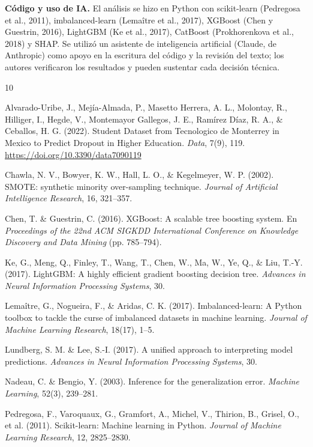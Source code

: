 \documentclass[11pt,a4paper]{article}
\begin{document}
\textbf{Código y uso de IA.} El análisis se hizo en Python con scikit-learn (Pedregosa et al., 2011), imbalanced-learn (Lemaître et al., 2017), XGBoost (Chen y Guestrin, 2016), LightGBM (Ke et al., 2017), CatBoost (Prokhorenkova et al., 2018) y SHAP. Se utilizó un asistente de inteligencia artificial (Claude, de Anthropic) como apoyo en la escritura del código y la revisión del texto; los autores verificaron los resultados y pueden sustentar cada decisión técnica.

\begin{thebibliography}{10}
\footnotesize
\setlength{\itemsep}{1pt}

Alvarado-Uribe, J., Mejía-Almada, P., Masetto Herrera, A. L., Molontay, R., Hilliger, I., Hegde, V., Montemayor Gallegos, J. E., Ramírez Díaz, R. A., \& Ceballos, H. G. (2022). Student Dataset from Tecnologico de Monterrey in Mexico to Predict Dropout in Higher Education. \textit{Data}, 7(9), 119. \url{https://doi.org/10.3390/data7090119}

Chawla, N. V., Bowyer, K. W., Hall, L. O., \& Kegelmeyer, W. P. (2002). SMOTE: synthetic minority over-sampling technique. \textit{Journal of Artificial Intelligence Research}, 16, 321--357.

Chen, T. \& Guestrin, C. (2016). XGBoost: A scalable tree boosting system. En \textit{Proceedings of the 22nd ACM SIGKDD International Conference on Knowledge Discovery and Data Mining} (pp. 785--794).

Ke, G., Meng, Q., Finley, T., Wang, T., Chen, W., Ma, W., Ye, Q., \& Liu, T.-Y. (2017). LightGBM: A highly efficient gradient boosting decision tree. \textit{Advances in Neural Information Processing Systems}, 30.

Lemaître, G., Nogueira, F., \& Aridas, C. K. (2017). Imbalanced-learn: A Python toolbox to tackle the curse of imbalanced datasets in machine learning. \textit{Journal of Machine Learning Research}, 18(17), 1--5.

Lundberg, S. M. \& Lee, S.-I. (2017). A unified approach to interpreting model predictions. \textit{Advances in Neural Information Processing Systems}, 30.

Nadeau, C. \& Bengio, Y. (2003). Inference for the generalization error. \textit{Machine Learning}, 52(3), 239--281.

Pedregosa, F., Varoquaux, G., Gramfort, A., Michel, V., Thirion, B., Grisel, O., et al. (2011). Scikit-learn: Machine learning in Python. \textit{Journal of Machine Learning Research}, 12, 2825--2830.


\end{thebibliography}
\end{document}
